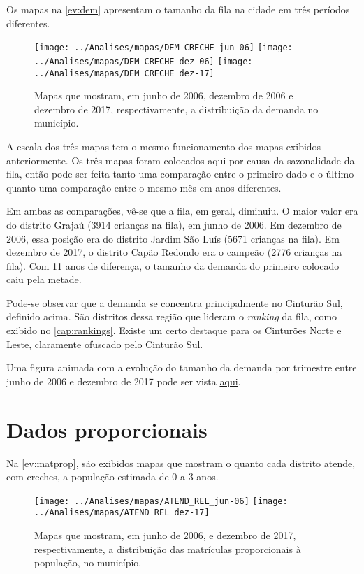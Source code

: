 Os mapas na \autoref{ev:dem} apresentam o tamanho da fila na cidade em três períodos diferentes.

\begin{figure}[H]
	\centering
	\texttt{[image: ../Analises/mapas/DEM\_CRECHE\_jun-06]}
	\texttt{[image: ../Analises/mapas/DEM\_CRECHE\_dez-06]}
	\texttt{[image: ../Analises/mapas/DEM\_CRECHE\_dez-17]}
	\caption{Mapas que mostram, em junho de 2006, dezembro de 2006 e dezembro de 2017, respectivamente, a distribuição da demanda no município.}
	\label{ev:dem}
\end{figure}

A escala dos três mapas tem o mesmo funcionamento dos mapas exibidos anteriormente. Os três mapas foram colocados aqui por causa da sazonalidade da fila, então pode ser feita tanto uma comparação entre o primeiro dado e o último quanto uma comparação entre o mesmo mês em anos diferentes.

Em ambas as comparações, vê-se que a fila, em geral, diminuiu. O maior valor era do distrito Grajaú (3914 crianças na fila), em junho de 2006. Em dezembro de 2006, essa posição era do distrito Jardim São Luís (5671 crianças na fila). Em dezembro de 2017, o distrito Capão Redondo era o campeão (2776 crianças na fila). Com 11 anos de diferença, o tamanho da demanda do primeiro colocado caiu pela metade.

Pode-se observar que a demanda se concentra principalmente no Cinturão Sul, definido acima. São distritos dessa região que lideram o \textit{ranking} da fila, como exibido no \autoref{cap:rankings}. Existe um certo destaque para os Cinturões Norte e Leste, claramente ofuscado pelo Cinturão Sul.

Uma figura animada com a evolução do tamanho da demanda por trimestre entre junho de 2006 e dezembro de 2017 pode ser vista \href{https://lsflp.github.io/MAC0213/Multimidia/DEM_CRECHE.gif}{aqui}.

\section{Dados proporcionais}

Na \autoref{ev:matprop}, são exibidos mapas que mostram o quanto cada distrito atende, com creches, a população estimada de 0 a 3 anos.

\begin{figure}[H]
	\centering
	\texttt{[image: ../Analises/mapas/ATEND\_REL\_jun-06]}
	\texttt{[image: ../Analises/mapas/ATEND\_REL\_dez-17]}
	\caption{Mapas que mostram, em junho de 2006, e dezembro de 2017, respectivamente, a distribuição das matrículas proporcionais à população, no município.}
	\label{ev:matprop}
\end{figure}

